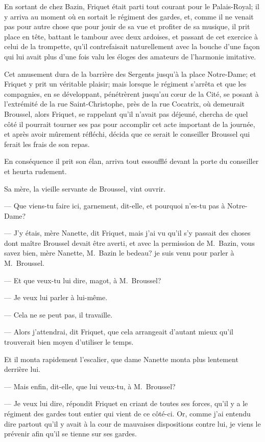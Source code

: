 En sortant de chez Bazin, Friquet était parti tout courant pour le Palais-Royal; il y arriva au moment où en sortait le régiment des gardes, et, comme il ne venait pas pour autre chose que pour jouir de sa vue et profiter de sa musique, il prit place en tête, battant le tambour avec deux ardoises, et passant de cet exercice à celui de la trompette, qu'il contrefaisait naturellement avec la bouche d'une façon qui lui avait plus d'une fois valu les éloges des amateurs de l'harmonie imitative.

Cet amusement dura de la barrière des Sergents jusqu'à la place Notre-Dame; et Friquet y prit un véritable plaisir; mais lorsque le régiment s'arrêta et que les compagnies, en se développant, pénétrèrent jusqu'au cœur de la Cité, se posant à l'extrémité de la rue Saint-Christophe, près de la rue Cocatrix, où demeurait Broussel, alors Friquet, se rappelant qu'il n'avait pas déjeuné, chercha de quel côté il pourrait tourner ses pas pour accomplir cet acte important de la journée, et après avoir mûrement réfléchi, décida que ce serait le conseiller Broussel qui ferait les frais de son repas.

En conséquence il prit son élan, arriva tout essoufflé devant la porte du conseiller et heurta rudement.

Sa mère, la vieille servante de Broussel, vint ouvrir.

— Que viens-tu faire ici, garnement, dit-elle, et pourquoi n'es-tu pas à Notre-Dame?

— J'y étais, mère Nanette, dit Friquet, mais j'ai vu qu'il s'y passait des choses dont maître Broussel devait être averti, et avec la permission de M.~Bazin, vous savez bien, mère Nanette, M.~Bazin le bedeau? je suis venu pour parler à M.~Broussel.

— Et que veux-tu lui dire, magot, à M.~Broussel?

— Je veux lui parler à lui-même.

— Cela ne se peut pas, il travaille.

— Alors j'attendrai, dit Friquet, que cela arrangeait d'autant mieux qu'il trouverait bien moyen d'utiliser le temps.

Et il monta rapidement l'escalier, que dame Nanette monta plus lentement derrière lui.

— Mais enfin, dit-elle, que lui veux-tu, à M.~Broussel?

— Je veux lui dire, répondit Friquet en criant de toutes ses forces, qu'il y a le régiment des gardes tout entier qui vient de ce côté-ci. Or, comme j'ai entendu dire partout qu'il y avait à la cour de mauvaises dispositions contre lui, je viens le prévenir afin qu'il se tienne sur ses gardes.

